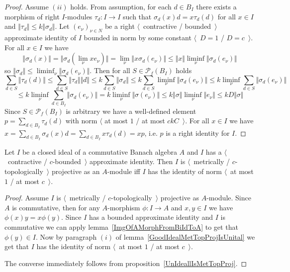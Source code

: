 \begin{proof}
Assume $(ii)$ holds. From assumption, for each $d\in B_I$ there exists a
morphism of right $I$-modules $\tau_d:I\to I$ such that
$\sigma_d(x)d=x\tau_d(d)$ for all $x\in I$ and 
$\Vert\tau_d\Vert\leq k\Vert\sigma_d\Vert$. 
Let ${(e_\nu)}_{\nu\in N}$ be a right $\langle$~contractive / bounded~$\rangle$ 
approximate identity of $I$ bounded in norm by some constant 
$\langle$~$D=1$ / $D=c$~$\rangle$. For all $x\in I$ we have
$$
\Vert\sigma_d(x)\Vert
=\Vert\sigma_d(\lim_\nu x e_\nu)\Vert
=\lim_\nu\Vert x\sigma_d(e_\nu)\Vert
\leq\Vert x\Vert\liminf_\nu\Vert\sigma_d(e_\nu)\Vert
$$
so $\Vert\sigma_d\Vert\leq \liminf_\nu\Vert\sigma_d(e_\nu)\Vert$. 
Then for all $S\in\mathcal{P}_{f}(B_I)$ holds
$$
\sum_{d\in S}\Vert \tau_d(d)\Vert
\leq \sum_{d\in S}\Vert \tau_d\Vert\Vert d\Vert
\leq k\sum_{d\in S}\Vert \sigma_d\Vert
\leq k\sum_{d\in S}\liminf_\nu \Vert \sigma_d(e_\nu)\Vert
\leq k\liminf_{\nu}\sum_{d\in S}\Vert \sigma_d(e_\nu) \Vert
$$
$$
\leq k\liminf_{\nu}\sum_{d\in B_I}\Vert \sigma_d(e_\nu) \Vert
=k\liminf_{\nu}\Vert\sigma(e_\nu)\Vert
\leq k\Vert\sigma\Vert\liminf_{\nu}\Vert e_\nu\Vert
\leq kD\Vert\sigma\Vert
$$
Since $S\in \mathcal{P}_{f}(B_I)$ is arbitrary we have a well-defined element
$p=\sum_{d\in B_I}\tau_d(d)$ with norm $\langle$ at most $1$ / at most
$ckC$~$\rangle$. For all $x\in I$ 
we have $x=\sum_{d\in B_I}\sigma_d(x)d=\sum_{d\in B_I}x\tau_d(d)=xp$, 
i.e. $p$ is a right identity for $I$.
\end{proof}

\begin{theorem}\label{GoodCommIdealMetTopProjIsUnital} Let $I$ be a closed ideal 
of a commutative Banach algebra $A$ and $I$ has a $\langle$~contractive /
$c$-bounded~$\rangle$ approximate identity. Then $I$ is $\langle$~metrically /
$c$-topologically~$\rangle$ projective as an $A$-module iff $I$ has the identity of
norm $\langle$~at most $1$ / at most $c$~$\rangle$.
\end{theorem} 
\begin{proof} Assume $I$ is $\langle$~metrically / $c$-topologically~$\rangle$
projective as $A$-module. Since $A$ is commutative, then for any $A$-morphism
$\phi:I\to A$ and $x,y\in I$ we have $\phi(x)y=x\phi(y)$. Since $I$ has a 
bounded approximate identity and $I$ is commutative we can apply
lemma~\ref{ImgOfAMorphFromBiIdToA} to get that $\phi(y)\in I$. Now by paragraph
$(i)$ of lemma~\ref{GoodIdealMetTopProjIsUnital} we get that $I$ has the
identity of norm $\langle$~at most $1$ / at most $c$~$\rangle$.

The converse immediately follows from proposition~\ref{UnIdeallIsMetTopProj}.
\end{proof}

